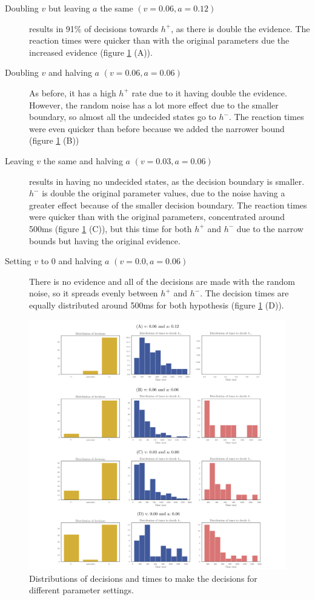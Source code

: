 \documentclass[12pt]{article}
\begin{document}
\begin{description}
    \item[Doubling $v$ but leaving $a$ the same $(v=0.06, a=0.12)$] results in 91\% of decisions towards $h^+$, as there is double the evidence. The reaction times were quicker than with the original parameters due the increased evidence (figure \ref{1-params} (A)). 
    \item[Doubling $v$ and halving $a$ $(v=0.06, a=0.06)$] As before, it has a high $h^+$ rate due to it having double the evidence. However, the random noise has a lot more effect due to the smaller boundary, so almost all the undecided states go to $h^-$. The reaction times were even quicker than before because we added the narrower bound (figure \ref{1-params} (B))
    \item[Leaving $v$ the same and halving $a$ $(v=0.03, a=0.06)$] results in having no undecided states, as the decision boundary is smaller. $h^-$ is double the original parameter values, due to the noise having a greater effect because of the smaller decision boundary. The reaction times were quicker than with the original parameters, concentrated around 500ms (figure \ref{1-params} (C)), but this time for both $h^+$ and $h^-$ due to the narrow bounds but having the original evidence.
    \item[Setting $v$ to 0 and halving $a$ $(v=0.0, a=0.06)$] There is no evidence and all of the decisions are made with the random noise, so it spreads evenly between $h^+$ and $h^-$. The decision times are equally distributed around 500ms for both hypothesis (figure \ref{1-params} (D)).
\end{description}

\begin{figure}[h!]
	\centering
	\hspace*{-0.6in}
	\includegraphics[width=1.2\linewidth]{figures/1-params.png}
	\caption{Distributions of decisions and times to make the decisions for different parameter settings.}
	\label{1-params}
\end{figure}
\end{document}
